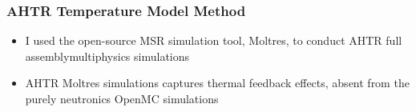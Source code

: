 \begin{frame}
    \frametitle{AHTR Temperature Model Method}
    \begin{itemize}
        \item I used the open-source MSR simulation tool, Moltres, to conduct AHTR
        full assemblymultiphysics simulations 
        \item AHTR Moltres simulations captures thermal feedback effects, absent
        from the purely neutronics OpenMC simulations
    \end{itemize}

\end{frame}